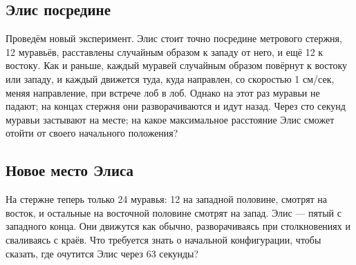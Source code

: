 \subsection*{Элис посредине}

Проведём новый эксперимент.
Элис стоит точно посредине метрового стержня, 12 муравьёв, расставлены случайным образом к западу от него, и ещё 12 к востоку.
Как и раньше, каждый муравей случайным образом повёрнут к востоку или западу, и каждый движется туда, куда направлен, со скоростью 1 см/сек, меняя направление, при встрече лоб в лоб.
Однако на этот раз муравьи не падают; 
на концах стержня они разворачиваются и идут назад.
Через сто секунд муравьи застывают на месте; на какое максимальное расстояние Элис сможет отойти от своего начального положения?

\subsection*{Новое место Элиса}

На стержне теперь только 24 муравья:
12 на западной половине, смотрят на восток,
и остальные на восточной половине смотрят на запад.
Элис --- пятый с западного конца.
Они движутся как обычно, разворачиваясь при столкновениях и сваливаясь с краёв.
Что требуется знать о начальной конфигурации, чтобы сказать, где очутится Элис через 63 секунды?
